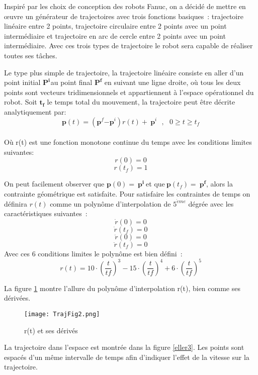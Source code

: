 
Inspir\'{e} par les choix de conception des robots Fanuc, on a d\'{e}cid\'{e} de mettre en {\oe}uvre un g\'{e}n\'{e}rateur de trajectoires avec trois fonctions basiques~: trajectoire lin\'{e}aire entre 2 points, trajectoire circulaire entre 2 points avec un point interm\'{e}diaire et trajectoire en arc de cercle entre 2 points avec un point interm\'{e}diaire. Avec ces trois types de trajectoire le robot sera capable de r\'{e}aliser toutes ses t\^{a}ches.


Le type plus simple de trajectoire, la trajectoire lin\'{e}aire consiste en aller d'un point initial ${\bm{P}}^{\bm{i}}$${}^{ }$au point final ${\bm{P}}^{\bm{f}}$ en suivant une ligne droite, o\`{u} tous les deux points sont vecteurs tridimensionnels et appartiennent \`{a} l'espace op\'{e}rationnel du robot. Soit $\bm{t_f}$ le temps total du mouvement, la trajectoire peut \^{e}tre d\'{e}crite analytiquement par:
\[\bm{p}(t)=({\bm{p}}^f{-\bm{p}}^i) r(t)+\ {\bm{p}}^i\ \ \ ,\ \ \ 0\ge t\ge t_f\] 
\pagebreak\\
O\`{u} r(t) est une fonction monotone continue du temps avec les conditions limites suivantes:
$$ r(0)=0 $$
$$ r(t_f)=1 $$

On peut facilement observer que $\bm{p}(0)=\ {\bm{p}}^{\bm{i}}\ $et que$\ \bm{p}(t_f)=\ {\bm{p}}^{\bm{f}}$, alors la contrainte g\'{e}om\'{e}trique est satisfaite. Pour satisfaire les contraintes de temps on d\'{e}finira $r(t)$ comme un polyn\^{o}me d'interpolation de ${5}^{\grave{e}me}$ d\'{e}gr\'{e}e avec les caract\'{e}ristiques suivantes~:
\[\dot{r}(0)= 0\] 
\[\dot{r}(t_f)= 0\] 
\[\ddot{r}(0)= 0\] 
\[\ddot{r}(t_f)= 0\] 
Avec ces 6 conditions limites le polyn\^{o}me est bien d\'{e}fini~:
\[r\left(t\right)=10 \cdot {\left(\frac{t}{tf}\right)}^3-15 \cdot {\left(\frac{t}{tf}\right)}^4+6 \cdot {\left(\frac{t}{tf}\right)}^5\]

La figure \ref{eller2} montre l'allure du polyn\^{o}me d'interpolation r(t), bien comme ses d\'{e}riv\'{e}es.

\begin{figure}[H]	%
	\texttt{[image: TrajFig2.png]}
	\caption{r(t) et ses d\'{e}riv\'{e}s}
	\label{eller2}
\end{figure}

La trajectoire dans l'espace est montr\'{e}e dans la figure \ref{eller3}. Les points sont espac\'{e}s d'un m\^{e}me intervalle de temps afin d'indiquer l'effet de la vitesse sur la trajectoire.

